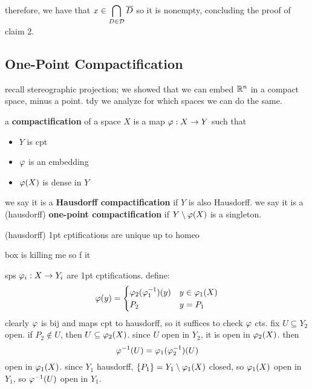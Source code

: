 therefore, we have that $x\in\displaystyle\bigcap_{D\in\mathcal{D}}\overline{D}$
so it is nonempty, concluding the proof of claim 2.

\newpage
\subsection{One-Point Compactification}

recall stereographic projection; we showed that we can embed $\mathbb{R}^{n}$ in a
compact space, minus a point.
tdy we analyze for which spaces we can do the same.

\begin{defn}
    a \textbf{compactification} of a space $X$ is a map $\varphi:X\rightarrow Y$ such that
    \begin{itemize}
        \item $Y$ is cpt
        \item $\varphi$ is an embedding
        \item $\varphi(X)$ is dense in $Y$
    \end{itemize}
    we say it is a \textbf{Hausdorff compactification} if $Y$ is also Hausdorff.
    we say it is a (hausdorff) \textbf{one-point compactification} if
    $Y\setminus\varphi(X)$ is a singleton.
\end{defn}

\begin{prop}
    (hausdorff) 1pt cptifications are unique up to homeo
\end{prop}

box is killing me so f it

sps $\varphi_{i}:X\rightarrow Y_{i}$ are 1pt cptifications.
define:
\begin{equation*}
    \varphi(y) =
    \begin{cases}
        \varphi_{2}(\varphi_{1}^{-1})(y) & y\in\varphi_{1}(X) \\
        P_{2} & y=P_{1}
    \end{cases}
\end{equation*}
clearly $\varphi$ is bij and maps cpt to hausdorff, so
it suffices to check $\varphi$ cts.
fix $U\subseteq Y_{2}$ open.
if $P_{2}\notin U$, then $U\subseteq\varphi_{2}(X)$.
since $U$ open in $Y_{2}$, it is open in $\varphi_{2}(X)$. then
\begin{equation*}
    \varphi^{-1}(U)=\varphi_{1}(\varphi_{2}^{-1})(U)
\end{equation*}
open in $\varphi_{1}(X)$.
since $Y_{1}$ hausdorff, $\left\{{P_{1}}\right\} = Y_{1}\setminus\varphi_{1}(X)$ closed, so
$\varphi_{1}(X)$ open in $Y_{1}$, so $\varphi^{-1}(U)$ open in $Y_{1}$.

